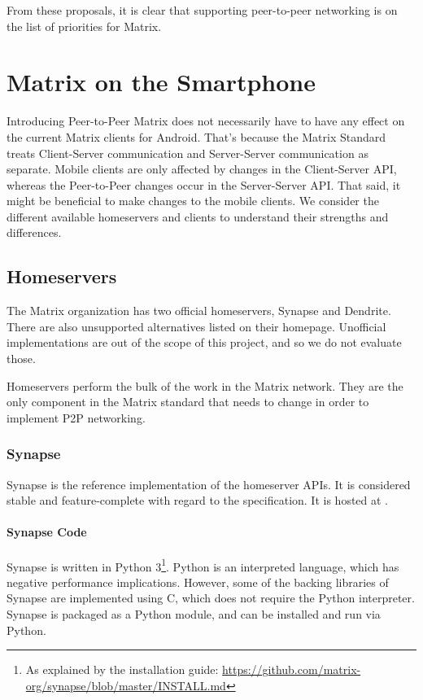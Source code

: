 From these proposals, it is clear that supporting peer-to-peer networking is on the list of priorities for Matrix.

\section{Matrix on the Smartphone}\label{sec:matrix_on_the_smartphone}
Introducing Peer-to-Peer Matrix does not necessarily have to have any effect on the current Matrix clients for Android.
That's because the Matrix Standard treats Client-Server communication and Server-Server communication as separate.
Mobile clients are only affected by changes in the Client-Server API, whereas the Peer-to-Peer changes occur in the Server-Server API\@.
That said, it might be beneficial to make changes to the mobile clients.
We consider the different available homeservers and clients to understand their strengths and differences.

\subsection{Homeservers}\label{sec:official_homeservers}
The Matrix organization has two official homeservers, Synapse\cite{matrix_org_synapse} and Dendrite\cite{matrix_org_dendrite}.
There are also unsupported alternatives listed on their homepage\cite{try_matrix}.
Unofficial implementations are out of the scope of this project, and so we do not evaluate those.

Homeservers perform the bulk of the work in the Matrix network.
They are the only component in the Matrix standard that needs to change in order to implement \ac{P2P} networking\cite{fosdem_event_p2p_matrix}.

\subsubsection{Synapse}
Synapse is the reference implementation of the homeserver \ac{API}s.
It is considered stable and feature-complete with regard to the specification.
It is hosted at .

\paragraph{Synapse Code}
Synapse is written in Python 3\footnote{As explained by the installation guide: \url{https://github.com/matrix-org/synapse/blob/master/INSTALL.md}}.
Python is an interpreted language, which has negative performance implications.
However, some of the backing libraries of Synapse are implemented using C, which does not require the Python interpreter.
Synapse is packaged as a Python module, and can be installed and run via Python.

